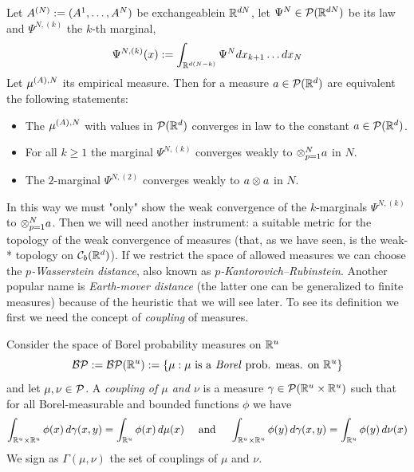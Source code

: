 \begin{proposition}\label{ch3:proposition:sznitman}
	Let $A^{(N)} := (A^1, \ldots, A^N)$ be exchangeable\footnotemark[1] \rv in $\mathbb{R}^{dN}$, let $\Psi^N\in \mathcal{P}(\mathbb{R}^{dN})$ be its law and $\Psi^{N, (k)}$ the $k$-th marginal, \ie
	\begin{equation*}
		\Psi^{N, (k)} (x) := \int_{\mathbb{R}^{d(N-k)}} \Psi^N dx_{k+1} \ldots dx_N
	\end{equation*}
	Let $\mu^{(A),N}$ its empirical measure.
	Then for a measure $a \in \mathcal{P}(\mathbb{R}^d)$ are equivalent the following statements:
	\begin{itemize}
		\item The \rv $\mu^{(A),N}$ with values in $\mathcal{P}(\mathbb{R}^d)$ converges in law to the constant \rv $a \in \mathcal{P}(\mathbb{R}^d)$.
		\item For all $k \geq 1$ the marginal $\Psi^{N, (k)}$ converges weakly to $ \otimes_{p=1}^N a$ in $N$.
		\item The $2$-marginal $\Psi^{N, (2)}$ converges weakly to $ a\otimes a$ in $N$.
	\end{itemize}
\end{proposition}

In this way we must "only" show the weak convergence of the $k$-marginals $\Psi^{N, (k)}$ to $ \otimes_{p=1}^N a$.
Then we will need another instrument: a suitable metric for the topology of the weak convergence of measures (that, as we have seen, is the weak-* topology on $\mathcal{C}_b(\mathbb{R}^d)$). If we restrict the space of allowed measures we can choose the \emph{$p$-Wasserstein distance}, also known as \emph{$p$-Kantorovich–Rubinstein}. Another popular name is \emph{Earth-mover distance} (the latter one can be generalized to finite measures) because of the heuristic that we will see later.
To see its definition we first we need the concept of \emph{coupling} of measures.

\begin{definition}
	Consider the space of Borel probability measures on $\mathbb{R}^u$
	\begin{equation}
		\mathcal{BP} := \mathcal{BP} (\mathbb{R}^u) := 
		\{\mu :
		\mu \text{ is a \emph{Borel} prob. meas. on } \mathbb{R}^u
		\}
	\end{equation}
	and let $\mu, \nu \in \mathcal{P}$. A \emph{coupling of $\mu$ and $\nu$} is a measure $\gamma \in \mathcal{P} (\mathbb{R}^u \times \mathbb{R}^u)$ such that for all Borel-measurable and bounded functions $\phi$ we have
	\begin{equation}
		\int_{\mathbb{R}^u \times \mathbb{R}^u} \phi(x) \,d\gamma(x,y) = \int_{\mathbb{R}^u} \phi(x) \,d\mu(x) 
		\quad \text{ and } \quad
		\int_{\mathbb{R}^u \times \mathbb{R}^u} \phi(y) \,d\gamma(x,y) = \int_{\mathbb{R}^u} \phi(y) \,d\nu(x) 
	\end{equation}\label{ch3:def-coupling}
	We sign as $\Gamma(\mu,\nu)$ the set of couplings of $\mu$ and $\nu$.
\end{definition}

